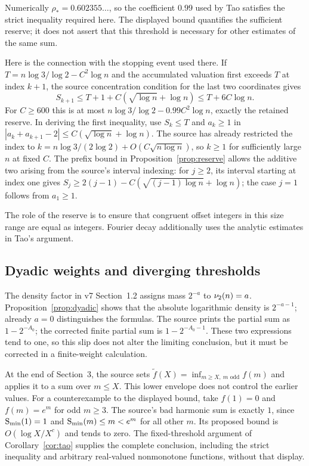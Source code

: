 Numerically $\rho_*=0.602355\ldots$, so the coefficient $0.99$ used by
Tao satisfies the strict inequality required here. The displayed bound
quantifies the sufficient reserve; it does not assert that this threshold
is necessary for other estimates of the same sum.

Here is the connection with the stopping event used there.  If
$T=n\log3/\log2-C^2\log n$ and the accumulated valuation first exceeds
$T$ at index $k+1$, the source concentration condition for the last two
coordinates gives
\[
 S_{k+1}\leq T+1+C(\sqrt{\log n}+\log n)
 \leq T+6C\log n.
\]
For $C\geq600$ this is at most
$n\log3/\log2-0.99C^2\log n$, exactly the retained reserve.
In deriving the first inequality, use $S_k\leq T$ and
$a_k\geq1$ in
$|a_k+a_{k+1}-2|\leq C(\sqrt{\log n}+\log n)$.
The source has already restricted the index to
$k=n\log3/(2\log2)+O(C\sqrt{n\log n})$, so $k\geq1$ for sufficiently
large $n$ at fixed $C$.  The prefix bound in
Proposition~\ref{prop:reserve} allows the additive two arising from
the source's interval indexing: for $j\geq2$, its interval starting
at index one gives $S_j\geq2(j-1)-C(\sqrt{(j-1)\log n}+\log n)$;
the case $j=1$ follows from $a_1\geq1$.

The role of the reserve is to ensure that congruent offset integers in
this size range are equal as integers.  Fourier decay additionally uses
the analytic estimates in Tao's argument.

\subsection{Dyadic weights and diverging thresholds}

The density factor in v7 Section~1.2 assigns mass $2^{-a}$ to
$\nu_2(n)=a$.  Proposition~\ref{prop:dyadic} shows that the absolute
logarithmic density is $2^{-a-1}$; already $a=0$ distinguishes the
formulas.  The source prints the partial sum as $1-2^{-A_0}$;
the corrected finite partial sum is $1-2^{-A_0-1}$.
These two expressions tend to one, so this slip does not alter the limiting
conclusion, but it must be corrected in a finite-weight calculation.

At the end of Section~3, the source sets
$\widetilde f(X)=\inf_{m\geq X,\ m\text{ odd}}f(m)$ and applies it to a
sum over $m\leq X$.  This lower envelope does not control the earlier
values.  For a counterexample to the displayed bound, take $f(1)=0$ and
$f(m)=e^m$ for odd
$m\geq3$.  The source's bad harmonic sum is exactly $1$, since
$\mathrm S_{\min}(1)=1$ and $\mathrm S_{\min}(m)\leq m<e^m$ for all other $m$.
Its proposed bound is $O(\log X/X^c)$ and tends to zero.
The fixed-threshold argument of Corollary~\ref{cor:tao} supplies the
complete conclusion, including the strict inequality and arbitrary
real-valued nonmonotone functions, without that display.

